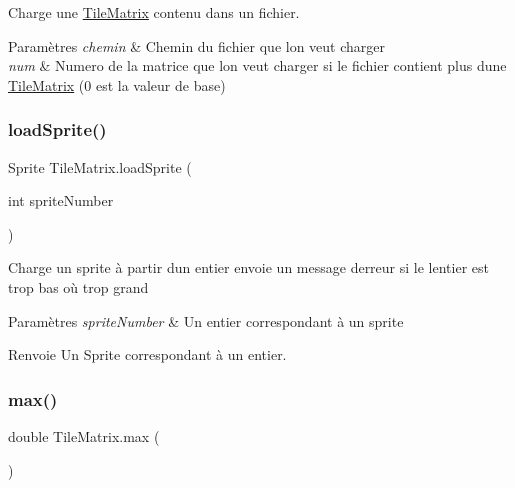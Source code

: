 Charge une \hyperlink{class_tile_matrix}{Tile\+Matrix} contenu dans un fichier. 


\begin{DoxyParams}{Paramètres}
{\em chemin} & Chemin du fichier que l\textquotesingle{}on veut charger \\
\hline
{\em num} & Numero de la matrice que l\textquotesingle{}on veut charger si le fichier contient plus d\textquotesingle{}une \hyperlink{class_tile_matrix}{Tile\+Matrix} (0 est la valeur de base) \\
\hline
\end{DoxyParams}
\mbox{\label{class_tile_matrix_a68d291b38ca0942fbf51683f3df2f0a6}} 
\subsubsection{\texorpdfstring{load\+Sprite()}{loadSprite()}}
{\footnotesize\ttfamily Sprite Tile\+Matrix.\+load\+Sprite (\begin{DoxyParamCaption}\item[{int}]{sprite\+Number }\end{DoxyParamCaption})}



Charge un sprite à partir d\textquotesingle{}un entier envoie un message d\textquotesingle{}erreur si le l\textquotesingle{}entier est trop bas où trop grand 


\begin{DoxyParams}{Paramètres}
{\em sprite\+Number} & Un entier correspondant à un sprite \\
\hline
\end{DoxyParams}
\begin{DoxyReturn}{Renvoie}
Un Sprite correspondant à un entier. 
\end{DoxyReturn}
\mbox{\label{class_tile_matrix_ab32694c884107298c3bb5fdc0f4622b3}} 
\subsubsection{\texorpdfstring{max()}{max()}}
{\footnotesize\ttfamily double Tile\+Matrix.\+max (\begin{DoxyParamCaption}{ }\end{DoxyParamCaption})}



